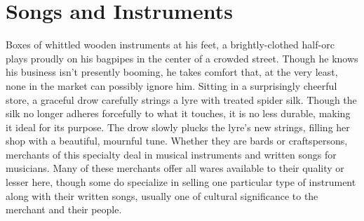 \documentclass[10pt,a4paper,twoside,twocolumn,openany,nodeprecatedcode,bg=print]{dndbook}
\begin{document}
\section{Songs and Instruments}
Boxes of whittled wooden instruments at his feet, a brightly-clothed half-orc plays proudly on his bagpipes in the center of a crowded street. Though he knows his business isn't presently booming, he takes comfort that, at the very least, none in the market can possibly ignore him.
Sitting in a surprisingly cheerful store, a graceful drow carefully strings a lyre with treated spider silk. Though the silk no longer adheres forcefully to what it touches, it is no less durable, making it ideal for its purpose. The drow slowly plucks the lyre's new strings, filling her shop with a beautiful, mournful tune.
Whether they are bards or craftspersons, merchants of this specialty deal in musical instruments and written songs for musicians. Many of these merchants offer all wares available to their quality or lesser here, though some do specialize in selling one particular type of instrument along with their written songs, usually one of cultural significance to the merchant and their people.
\end{document}
